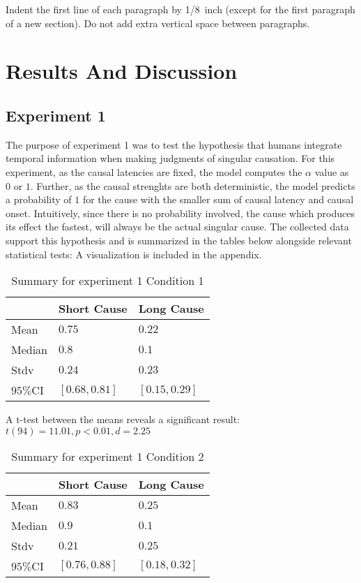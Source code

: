\documentclass[10pt,letterpaper]{article}
\begin{document}
Indent the first line of each paragraph by 1/8~inch (except for the
first paragraph of a new section). Do not add extra vertical space
between paragraphs.


\section{Results And Discussion}

\subsection{Experiment 1}
The purpose of experiment 1 was to test the hypothesis that humans integrate temporal information when making
judgments of singular causation. For this experiment, as the causal latencies are fixed, the model computes the $\alpha$ value
as $0$ or $1$. Further, as the causal strenghts are both deterministic, the model predicts a probability of $1$ for the cause with the smaller sum of causal latency and causal onset. Intuitively, since there is no probability involved, the cause which produces its effect the fastest, will always be the actual singular cause. The collected data support this hypothesis and is summarized in the tables below alongside
relevant statistical tests:
A visualization is included in the appendix.
\begin{table}[H]
\begin{center} 
\caption{Summary for experiment 1 Condition 1} 
\label{summary exp1} 
\vskip 0.12in
\begin{tabular}{lll} 
\toprule
& Short Cause &  Long Cause\\
\midrule
	Mean & $0.75$ & $0.22$  \\
	Median & $0.8$ & $0.1$  \\
	Stdv & $0.24$ & $0.23$  \\
	$95\%$CI & $[0.68, 0.81]$ &  $[0.15, 0.29]$ \\
\bottomrule
\end{tabular} 
\end{center} 
\end{table}
A t-test between the means reveals a significant result: $t(94) = 11.01, p < 0.01, d = 2.25$
\begin{table}[H]
\begin{center} 
\caption{Summary for experiment 1 Condition 2} 
\label{summary exp1} 
\vskip 0.12in
\begin{tabular}{lll} 
\toprule
& Short Cause &  Long Cause\\
\midrule
	Mean & $0.83$ & $0.25$  \\
	Median & $0.9$ & $0.1$  \\
	Stdv & $0.21$ & $0.25$  \\
	$95\%$CI & $[0.76, 0.88]$ &  $[0.18, 0.32]$ \\
\bottomrule
\end{tabular} 
\end{center} 
\end{table}
\end{document}
